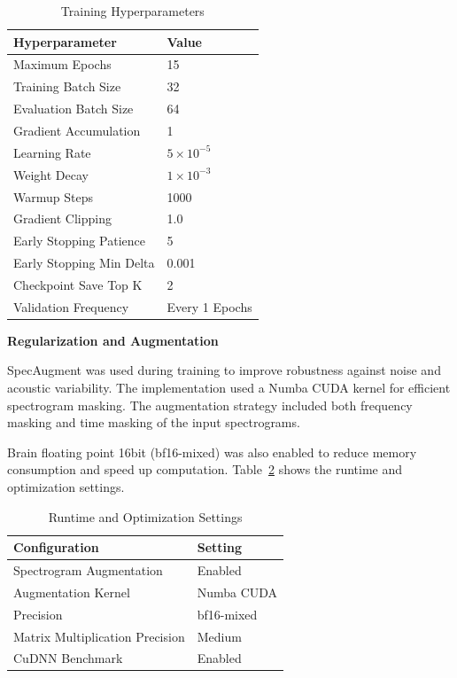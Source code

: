 \begin{table}[H]
\caption{Training Hyperparameters}
\label{tab:indic_train}
\centering
\begin{tabular}{|l|l|}
\hline
\textbf{Hyperparameter} & \textbf{Value} \\
\hline
Maximum Epochs & 15 \\
Training Batch Size & 32 \\
Evaluation Batch Size & 64 \\
Gradient Accumulation & 1 \\
Learning Rate & $5\times10^{-5}$ \\
Weight Decay & $1\times10^{-3}$ \\
Warmup Steps & 1000 \\
Gradient Clipping & 1.0 \\
Early Stopping Patience & 5 \\
Early Stopping Min Delta & 0.001 \\
Checkpoint Save Top K & 2 \\
Validation Frequency & Every 1 Epochs \\
\hline
\end{tabular}
\end{table}

\textbf{Regularization and Augmentation}

SpecAugment was used during training to improve robustness against noise and acoustic variability. The implementation used a Numba CUDA kernel for efficient spectrogram masking. The augmentation strategy included both frequency masking and time masking of the input spectrograms.

Brain floating point 16bit (bf16-mixed) was also enabled to reduce memory consumption and speed up computation. Table~\ref{tab:indic_runtime} shows the runtime and optimization settings.

\begin{table}[H]
\caption{Runtime and Optimization Settings}
\label{tab:indic_runtime}
\centering
\begin{tabular}{|l|l|}
\hline
\textbf{Configuration} & \textbf{Setting} \\
\hline
Spectrogram Augmentation & Enabled \\
Augmentation Kernel & Numba CUDA \\
Precision & bf16-mixed\\
Matrix Multiplication Precision & Medium \\
CuDNN Benchmark & Enabled \\
\hline
\end{tabular}
\end{table}

